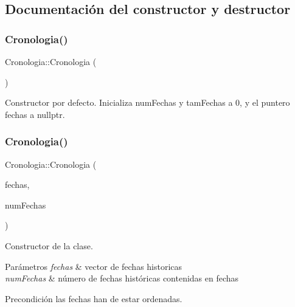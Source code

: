 \subsection{Documentación del constructor y destructor}
\mbox{\label{classCronologia_ac0026b1919148f6cd6cf4ca4c357771e}} 
\subsubsection{\texorpdfstring{Cronologia()}{Cronologia()}\hspace{0.1cm}{\footnotesize\ttfamily [1/3]}}
{\footnotesize\ttfamily Cronologia\+::\+Cronologia (\begin{DoxyParamCaption}{ }\end{DoxyParamCaption})}



Constructor por defecto. Inicializa num\+Fechas y tam\+Fechas a 0, y el puntero fechas a nullptr. 

\mbox{\label{classCronologia_ad2ef0894a05480239fd96e272afb862a}} 
\subsubsection{\texorpdfstring{Cronologia()}{Cronologia()}\hspace{0.1cm}{\footnotesize\ttfamily [2/3]}}
{\footnotesize\ttfamily Cronologia\+::\+Cronologia (\begin{DoxyParamCaption}\item[{\hyperlink{classFechaHistorica}{Fecha\+Historica} $\ast$}]{fechas,  }\item[{int}]{num\+Fechas }\end{DoxyParamCaption})}



Constructor de la clase. 


\begin{DoxyParams}{Parámetros}
{\em fechas} & vector de fechas historicas \\
\hline
{\em num\+Fechas} & número de fechas históricas contenidas en fechas \\
\hline
\end{DoxyParams}
\begin{DoxyPrecond}{Precondición}
las fechas han de estar ordenadas. 
\end{DoxyPrecond}
\mbox{\label{classCronologia_a1a0efdfa1cd0451776dda65f3862105b}} 
